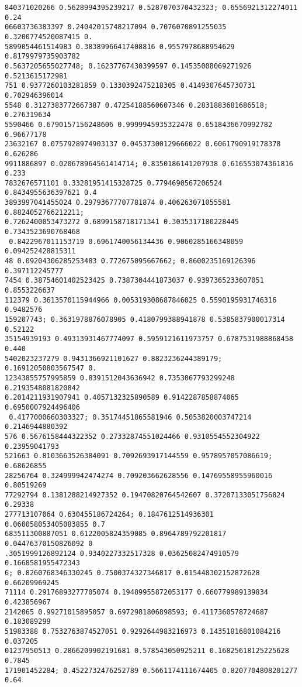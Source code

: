 \documentclass[12pt,a4paper]{article}
\begin{document}
\begin{lstlisting}
840371020266 0.5628994395239217 0.5287070370432323; 0.6556921312274011 0.24
06603736383397 0.24042015748217094 0.7076070891255035 0.3200774520087415 0.
5899054461514983 0.38389966417408816 0.9557978688954629 0.8179979735903782 
0.5637205655027748; 0.16237767430399597 0.14535008069271926 0.5213615172981
751 0.9377260103281859 0.1330392475218305 0.4149307645730731 0.702946396014
5548 0.3127383772667387 0.47254188560607346 0.2831883681686518; 0.276319634
5590466 0.6790157156248606 0.9999945935322478 0.6518436670992782 0.96677178
23632167 0.0757928974903137 0.04537300129666022 0.6061790919178378 0.626286
9911886897 0.020678964561414714; 0.8350186141207938 0.616553074361816 0.233
7832676571101 0.33281951415328725 0.7794690567206524 0.8434955636397621 0.4
3893997041455024 0.29793677707781874 0.406263071055581 0.8824052766212211; 
0.7262400053473272 0.6899158718171341 0.3035317180228445 0.7343523690768468
 0.8422967011153719 0.6961740056134436 0.9060285166348059 0.094252428815311
48 0.09204306285253483 0.772675095667662; 0.8600235169126396 0.397112245777
7454 0.38754601402523425 0.7387304441873037 0.9397365233607051 0.8553226637
112379 0.3613570115944966 0.005319308687846025 0.5590195931746316 0.9482576
159207743; 0.3631978876078905 0.4180799388941878 0.5385837900017314 0.52122
35154939193 0.49313931467774097 0.5959121611973757 0.6787531988868458 0.440
5402023237279 0.9431366921101627 0.8823236244389179; 0.16912050803567547 0.
12343855757995859 0.8391512043636942 0.7353067793299248 0.2193548081820842 
0.2014211931907941 0.4057132325890589 0.9142287858874065 0.6950007924496406
 0.4177000660303327; 0.35174451865581946 0.5053820003747214 0.2146944880392
576 0.5676158444322352 0.27332874551024466 0.9310554552304922 0.23959041793
521663 0.8103663526384091 0.7092693917144559 0.9578957057086619; 0.68626855
28256764 0.324999942474274 0.709203662628556 0.14769558955960016 0.80519269
77292794 0.1381288214927352 0.19470820764542607 0.37207133051756824 0.29338
277713107064 0.630455186724264; 0.1847612514936301 0.060058053405083855 0.7
683511300887051 0.6122005824359085 0.8964789792201817 0.04476370150826092 0
.3051999126892124 0.9340227332517328 0.03625082474910579 0.1668581955472343
6; 0.8260768346330245 0.7500374327346817 0.015448302152872628 0.66209969245
71114 0.29176893277705074 0.19489955872053177 0.660779989139834 0.423856967
2142065 0.99271015895057 0.6972981806898593; 0.4117360578724687 0.183089299
51983388 0.7532763874527051 0.9292644983216973 0.14351816801084216 0.037205
01237950513 0.2866209902191681 0.578543050925211 0.16825618125225628 0.7845
171901452284; 0.4522732476252789 0.5661174111674405 0.8207704808201277 0.64

\end{lstlisting}
\end{document}
